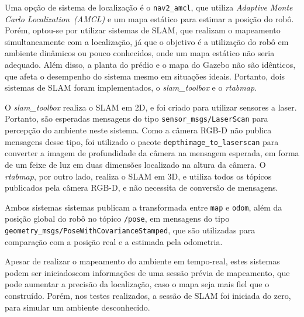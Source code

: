 \documentclass[repeatfields,xlists,xpacks,oneside,yearsonly]{ufrgscca}
\begin{document}

Uma opção de sistema de localização é o \texttt{nav2\_amcl}, que utiliza
\textit{Adaptive Monte Carlo Localization~(AMCL)} e um mapa estático para
estimar a posição do robô.
Porém, optou-se por utilizar sistemas de SLAM, que realizam
o mapeamento simultaneamente com a localização, já que
o objetivo é a utilização do robô em ambiente dinâmicos ou pouco conhecidos,
onde um mapa estático não seria adequado.
Além disso, a planta do prédio e o mapa do Gazebo não são idênticos, que
afeta o desempenho do sistema mesmo em situações ideais.
Portanto, dois sistemas de SLAM foram implementados,
o \textit{slam\_toolbox} e o \textit{rtabmap}.

O \textit{slam\_toolbox} realiza o SLAM em 2D, e foi criado para utilizar sensores
a laser. Portanto, são esperadas mensagens do tipo \texttt{sensor\_msgs/LaserScan}
para percepção do ambiente neste sistema. Como a câmera RGB-D não publica mensagens
desse tipo, foi utilizado o pacote \texttt{depthimage\_to\_laserscan} para converter
a imagem de profundidade da câmera na mensagem esperada, em forma de um feixe de luz
em duas dimensões localizado na altura da câmera.
O \textit{rtabmap}, por outro lado, realiza o SLAM em 3D, e utiliza todos os
tópicos publicados pela câmera RGB-D, e não necessita de conversão de mensagens.

Ambos sistemas sistemas publicam a transformada entre \texttt{map} e \texttt{odom},
além da posição global do robô no tópico \texttt{/pose}, em mensagens do tipo
\texttt{geometry\_msgs/PoseWithCovarianceStamped}, que são utilizadas para
comparação com a posição real e a estimada pela odometria.

Apesar de realizar o mapeamento do ambiente em tempo-real, estes sistemas
podem ser iniciadoscom informações de uma sessão prévia de mapeamento,
que pode aumentar a precisão da localização, caso o mapa seja mais fiel
que o construído. Porém, nos testes realizados, a sessão de SLAM foi iniciada
do zero, para simular um ambiente desconhecido.

\end{document}
